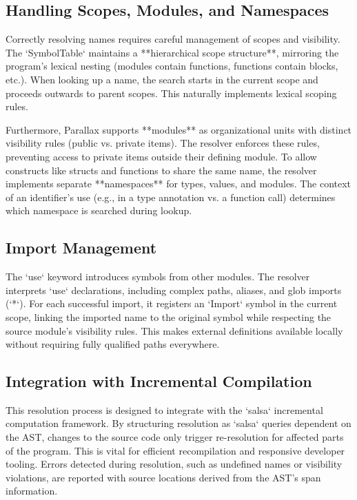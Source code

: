 \subsection{Handling Scopes, Modules, and Namespaces} %
Correctly resolving names requires careful management of scopes and visibility. The `SymbolTable` maintains a **hierarchical scope structure**, mirroring the program's lexical nesting (modules contain functions, functions contain blocks, etc.). When looking up a name, the search starts in the current scope and proceeds outwards to parent scopes. This naturally implements lexical scoping rules.

Furthermore, Parallax supports **modules** as organizational units with distinct visibility rules (public vs. private items). The resolver enforces these rules, preventing access to private items outside their defining module. To allow constructs like structs and functions to share the same name, the resolver implements separate **namespaces** for types, values, and modules. The context of an identifier's use (e.g., in a type annotation vs. a function call) determines which namespace is searched during lookup.

\subsection{Import Management} %
The `use` keyword introduces symbols from other modules. The resolver interprets `use` declarations, including complex paths, aliases, and glob imports (`*`). For each successful import, it registers an `Import` symbol in the current scope, linking the imported name to the original symbol while respecting the source module's visibility rules. This makes external definitions available locally without requiring fully qualified paths everywhere.

\subsection{Integration with Incremental Compilation} %
This resolution process is designed to integrate with the `salsa` incremental computation framework. By structuring resolution as `salsa` queries dependent on the AST, changes to the source code only trigger re-resolution for affected parts of the program. This is vital for efficient recompilation and responsive developer tooling. Errors detected during resolution, such as undefined names or visibility violations, are reported with source locations derived from the AST's span information.

